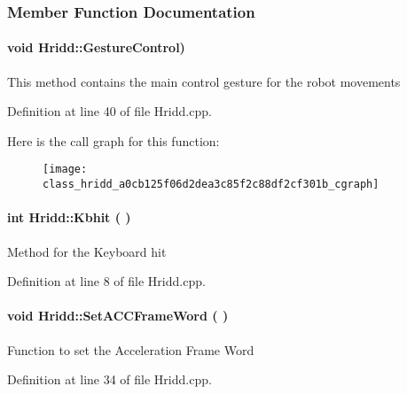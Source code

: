 \begin{appendices}
\subsubsection{\-Member \-Function \-Documentation}
\paragraph[{\-Gesture\-Control}]{\setlength{\rightskip}{0pt plus 5cm}void {\bf \-Hridd\-::\-Gesture\-Control})}

\-This method contains the main control gesture for the robot movements 

\-Definition at line 40 of file \-Hridd.\-cpp.

\-Here is the call graph for this function\-:\nopagebreak
\begin{figure}[H]
\begin{center}
\leavevmode
\texttt{[image: class\_hridd\_a0cb125f06d2dea3c85f2c88df2cf301b\_cgraph]}
\end{center}
\end{figure}





\paragraph[{\-Kbhit}]{\setlength{\rightskip}{0pt plus 5cm}int {\bf \-Hridd\-::\-Kbhit} (
)}\label{class_hridd_a4685da7617842bea560df152d2c5eb2e}
\-Method for the \-Keyboard hit 

\-Definition at line 8 of file \-Hridd.\-cpp.

\paragraph[{\-Set\-A\-C\-C\-Frame\-Word}]{\setlength{\rightskip}{0pt plus 5cm}void {\bf \-Hridd\-::\-Set\-A\-C\-C\-Frame\-Word} (
)}\label{class_hridd_ab782ddac948b4f7aca0596408cf5b714}
\-Function to set the \-Acceleration \-Frame \-Word 

\-Definition at line 34 of file \-Hridd.\-cpp.




\end{appendices}
